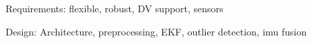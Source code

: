 Requirements: flexible, robust, DV support, sensors

Design: Architecture, preprocessing, EKF, outlier detection, imu fusion